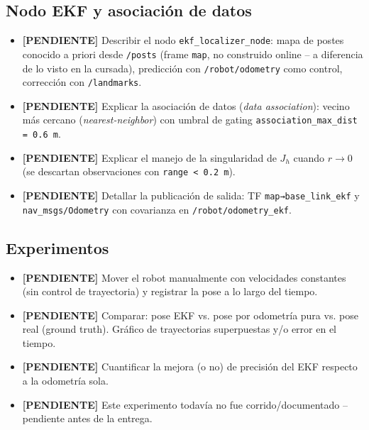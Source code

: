 \documentclass[11pt,a4paper]{article}
\newcommand{\TODO}[1]{\textcolor{todocolor}{\textbf{[PENDIENTE]} #1}}
\newenvironment{tareas}{\begin{itemize}\setlength{\itemsep}{2pt}}{\end{itemize}}
\begin{document}
\subsection{Nodo EKF y asociación de datos}
\begin{tareas}
    \item \TODO{Describir el nodo \texttt{ekf\_localizer\_node}: mapa de postes conocido a priori desde \texttt{/posts} (frame \texttt{map}, no construido online -- a diferencia de lo visto en la cursada), predicción con \texttt{/robot/odometry} como control, corrección con \texttt{/landmarks}.}
    \item \TODO{Explicar la asociación de datos (\emph{data association}): vecino más cercano (\emph{nearest-neighbor}) con umbral de gating \texttt{association\_max\_dist = 0.6 m}.}
    \item \TODO{Explicar el manejo de la singularidad de $J_h$ cuando $r \to 0$ (se descartan observaciones con \texttt{range < 0.2 m}).}
    \item \TODO{Detallar la publicación de salida: TF \texttt{map→base\_link\_ekf} y \texttt{nav\_msgs/Odometry} con covarianza en \texttt{/robot/odometry\_ekf}.}
\end{tareas}

\subsection{Experimentos}
\begin{tareas}
    \item \TODO{Mover el robot manualmente con velocidades constantes (sin control de trayectoria) y registrar la pose a lo largo del tiempo.}
    \item \TODO{Comparar: pose EKF vs. pose por odometría pura vs. pose real (ground truth). Gráfico de trayectorias superpuestas y/o error en el tiempo.}
    \item \TODO{Cuantificar la mejora (o no) de precisión del EKF respecto a la odometría sola.}
    \item \TODO{Este experimento todavía no fue corrido/documentado -- pendiente antes de la entrega.}
\end{tareas}

\end{document}
